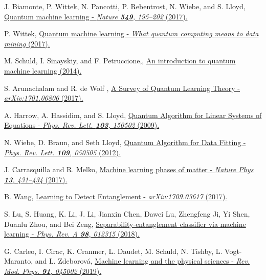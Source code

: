\documentclass[a4paper,twocolumn,11pt,unpublished]{quantumarticle}
\begin{document}

\begin{thebibliography}{39}

 J. Biamonte, P. Wittek, N. Pancotti, P. Rebentrost, N. Wiebe, and S. Lloyd,
  \href{https://doi.org/10.1038/nature23474}{Quantum machine learning - \textit{Nature \textbf{549}, 195–202} (2017).}

 P. Wittek,
  \href{https://doi.org/10.1016/C2013-0-19170-2}{Quantum machine learning - \textit{What quantum computing means to data mining} (2017).}

 M. Schuld, I. Sinayskiy, and F. Petruccione,,
  \href{https://doi.org/10.1080/00107514.2014.964942}{An introduction to quantum machine learning (2014).}
  
   S. Arunachalam and R. de Wolf ,
  \href{https://arxiv.org/abs/1701.06806}{A Survey of Quantum Learning Theory - \textit{arXiv:1701.06806} (2017).}
  
   A. Harrow, A. Hassidim, and S. Lloyd,
  \href{https://doi.org/10.1103/PhysRevLett.103.150502}{Quantum Algorithm for Linear Systems of Equations - \textit{Phys. Rev. Lett. \textbf{103}, 150502} (2009).}
  
   N. Wiebe, D. Braun, and Seth Lloyd,
  \href{https://doi.org/10.1103/PhysRevLett.109.050505}{Quantum Algorithm for Data Fitting - \textit{Phys. Rev. Lett. \textbf{109}, 050505} (2012).}
  
   J. Carrasquilla and R. Melko,
  \href{https://doi.org/10.1038/nphys4035}{Machine learning phases of matter - \textit{Nature Phys \textbf{13}, 431–434} (2017).}
  
   B. Wang,
  \href{https://arxiv.org/abs/1709.03617}{Learning to Detect Entanglement - \textit{arXiv:1709.03617} (2017).}
  
   S. Lu, S. Huang, K. Li, J. Li, Jianxin Chen, Dawei Lu, Zhengfeng Ji, Yi Shen, Duanlu Zhou, and Bei Zeng,
  \href{https://doi.org/10.1103/PhysRevA.98.012315}{Separability-entanglement classifier via machine learning - \textit{Phys. Rev. A \textbf{98}, 012315} (2018).}
  
   G. Carleo, I. Cirac, K. Cranmer, L. Daudet, M. Schuld, N. Tishby, L. Vogt-Maranto, and L. Zdeborová,
  \href{https://doi.org/10.1103/RevModPhys.91.045002}{Machine learning and the physical sciences - \textit{Rev. Mod. Phys. \textbf{91}, 045002} (2019).}
  

\end{thebibliography}
\end{document}
